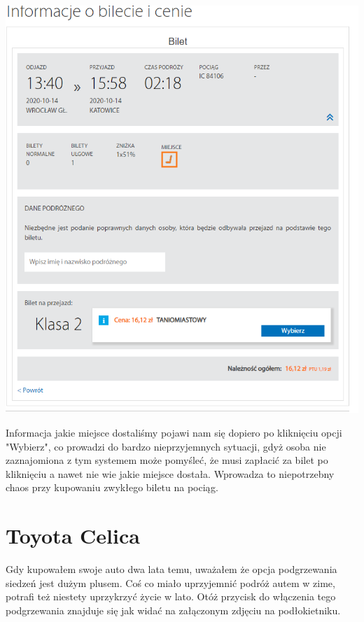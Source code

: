 \documentclass{article}
\begin{document}
\begin{center}
    \includegraphics[scale=0.50]{informacje o bilecie.PNG}
\end{center}

Informacja jakie miejsce dostaliśmy pojawi nam się dopiero po kliknięciu opcji "Wybierz", co prowadzi do bardzo nieprzyjemnych sytuacji, gdyż osoba nie zaznajomiona z tym systemem
może pomyśleć, że musi zapłacić za bilet po kliknięciu a nawet nie wie jakie miejsce dostała. Wprowadza to niepotrzebny chaos przy kupowaniu zwykłego biletu na pociąg.

\newpage
\section{Toyota Celica}
Gdy kupowałem swoje auto dwa lata temu, uważałem że opcja podgrzewania siedzeń jest dużym plusem. Coś co miało uprzyjemnić podróż autem w zime, potrafi też niestety uprzykrzyć życie w lato.
Otóż przycisk do włączenia tego podgrzewania znajduje się jak widać na załączonym zdjęciu na podłokietniku. 
\end{document}
